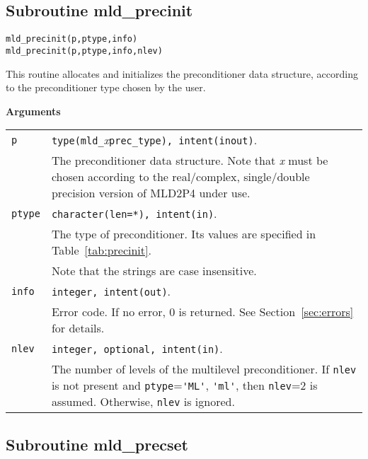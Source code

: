 \clearpage

\subsection{Subroutine mld\_precinit\label{sec:precinit}}

\begin{center}
\verb|mld_precinit(p,ptype,info)| \\
\verb|mld_precinit(p,ptype,info,nlev)| \\
\end{center}

\noindent
This routine allocates and initializes the preconditioner data structure,
according to the preconditioner type chosen by the user.

{\baselineskip\noindent\large\bfseries Arguments}

\begin{tabular}{p{1.2cm}p{12cm}}
\verb|p|      & \verb|type(mld_|\emph{x}\verb|prec_type), intent(inout)|.\\
              & The preconditioner data structure. Note that \emph{x}
                must be chosen according to the real/complex, single/double
                precision version of MLD2P4 under use.\\
\verb|ptype|  & \verb|character(len=*), intent(in)|.\\
              & The type of preconditioner. Its values are specified
              in Table~\ref{tab:precinit}.\\
              & Note that the strings are case insensitive.\\
\verb|info|   & \verb|integer, intent(out)|.\\
              & Error code. If no error, 0 is returned. See Section~\ref{sec:errors} for details.\\
\verb|nlev|   & \verb|integer, optional, intent(in)|.\\
              & The number of levels of the multilevel preconditioner.
                If \verb|nlev| is not present and \verb|ptype|=\verb|'ML'|, \verb|'ml'|, 
                then \verb|nlev|=2 is assumed. Otherwise, \verb|nlev| is ignored.\\
\end{tabular}

\clearpage

\subsection{Subroutine mld\_precset\label{sec:precset}}

